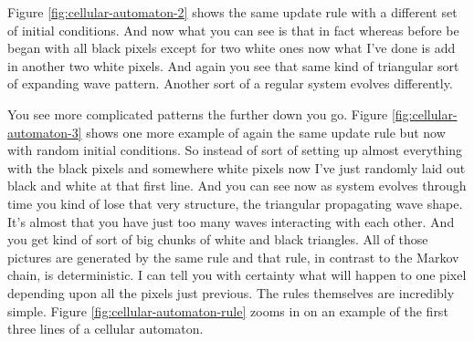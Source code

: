 \documentclass[]{article}
\begin{document}
Figure \ref{fig:cellular-automaton-2} shows the same update rule with a different set of initial conditions. And now what you can see is that in fact whereas before be began with all black pixels except for two white ones now what I've done is add in another two white pixels. And again you see that same kind of triangular sort of expanding wave pattern. Another sort of a regular system evolves differently.

You see more complicated patterns the further down you go. Figure \ref{fig:cellular-automaton-3} shows one more example of again the same update rule
but now with random initial conditions.
So instead of sort of setting up almost everything with the black pixels
and somewhere white pixels now I've just randomly laid out black and white at that first line.
And you can see now as system evolves through time you kind of lose that very structure, the triangular propagating wave shape.
It's almost that you have just too many waves interacting with each other.
And you get kind of sort of big chunks of white and black triangles.
All of those pictures are generated by the same rule and that rule, in contrast to the Markov chain, is deterministic.
I can tell you with certainty what will happen to one pixel depending upon all the pixels just previous.
The rules themselves are incredibly simple. Figure \ref{fig:cellular-automaton-rule} zooms in on an example of the first three lines
of a cellular automaton. 
\end{document}
